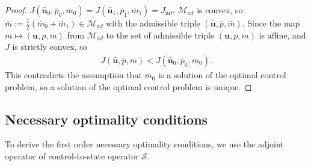 \documentclass{amsart}
\newcommand{\algn}[1]{\begin{align} #1 \end{align}}
\newcommand{\LRp}[1]{\left( #1 \right)}
\newcommand{\LRa}[1]{\left< #1 \right>}
\begin{document}
\begin{proof}
	$J \LRp{\bar{\boldsymbol{u}}_0, \bar{p}_0, \bar{m}_0} = J \LRp{\bar{\boldsymbol{u}}_1, \bar{p}_1, \bar{m}_1} = J_{\inf}$. 
	$\mathcal{M}_{ad}$ is convex, so $\bar{m} := \frac{1}{2} \LRp{\bar{m}_0 + \bar{m}_1} \in \mathcal{M}_{ad}$ with the admissible triple $(\bar{\boldsymbol{u}}, \bar{p}, \bar{m})$. Since the map $m \mapsto \LRp{\boldsymbol{u}, p, m}$ from $\mathcal{M}_{ad}$ to the set of admissible triple $\LRp{\boldsymbol{u}, p, m}$ is affine, and $J$ is strictly convex, so
	\algn{
		\nonumber J \LRp{\bar{\boldsymbol{u}}, \bar{p}, \bar{m}} < J \LRp{\bar{\boldsymbol{u}}_0, \bar{p}_0, \bar{m}_0}. 
	}
	This contradicts the assumption that $\bar{m}_0$ is a solution of the optimal control problem, so a solution of the optimal control problem is unique.
\end{proof}
\subsection{Necessary optimality conditions}
To derive the first order necessary optimality conditions, we use the adjoint operator of control-to-state operator $\mathcal{S}$. 
\end{document}
